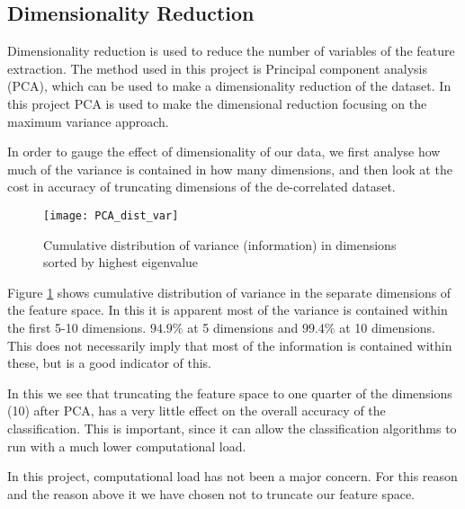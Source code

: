 \subsection*{Dimensionality Reduction}
Dimensionality reduction is used to reduce the number of variables of the feature extraction.
The method used in this project is Principal component analysis (PCA), which can be used to make a dimensionality reduction of the dataset.
In this project PCA is used to make the dimensional reduction focusing on the maximum variance approach.

In order to gauge the effect of dimensionality of our data, we first analyse how much of the variance is contained in how many dimensions, and then look at the cost in accuracy of truncating dimensions of the de-correlated dataset.

\begin{figure}[H]
\centering
\texttt{[image: PCA\_dist\_var]}
\caption{Cumulative distribution of variance (information) in dimensions sorted by highest eigenvalue}
\label{fig:PCA_dist_rap}
\end{figure}

Figure \ref{fig:PCA_dist_rap} shows cumulative distribution of variance in the separate dimensions of the feature space.
In this it is apparent most of the variance is contained within the first 5-10 dimensions. 
$ 94.9 \% $ at 5 dimensions and $ 99.4 \% $ at 10 dimensions.
This does not necessarily imply that most of the information is contained within these, but is a good indicator of this.

In this we see that truncating the feature space to one quarter of the dimensions (10) after PCA, has a very little effect on the overall accuracy of the classification.
This is important, since it can allow the classification algorithms to run with a much lower computational load.

In this project, computational load has not been a major concern. For this reason and the reason above it we have chosen not to truncate our feature space.